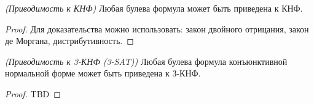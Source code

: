 \begin{theorem}
\emph{(Приводимость к КНФ)}
Любая булева формула может быть приведена к КНФ. 
\end{theorem}

\begin{proof}
Для доказательства можно использовать: закон двойного отрицания, закон
де Моргана, дистрибутивность.
\end{proof}

\begin{theorem}
\emph{(Приводимость к 3-КНФ (3-SAT))}
Любая булева формула конъюнктивной нормальной форме может быть
приведена к 3-КНФ.  
\end{theorem}

\begin{proof}
TBD
\end{proof}

